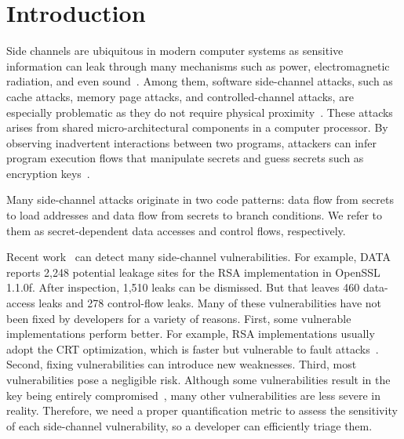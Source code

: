 \section{Introduction} 
Side channels are ubiquitous in modern computer systems as sensitive
information can leak through many mechanisms such as power,
electromagnetic radiation, and even
sound~\cite{agrawal2002side,kar20178,chari1999towards,217605,genkin2014rsa}.
Among them, software side-channel attacks, such as cache attacks, memory page
attacks, and controlled-channel attacks, are especially problematic as they do not require physical proximity~\cite{7163052,217543,217589,lee2017inferring,191010,liu2015last}. These
attacks arises from shared micro-architectural components in a computer processor.
By observing inadvertent interactions between two programs, attackers can infer program
execution flows that manipulate secrets and guess secrets such as encryption
keys~\cite{Osvik2006,Gullasch:2011:CGB:2006077.2006784,203878,10.1007/978-3-540-45238-6_6}.


Many side-channel attacks originate
in two code patterns: data flow from secrets to load
addresses and data flow from secrets to branch conditions. We refer to them as
secret-dependent data accesses and control flows, respectively. 

Recent work~\cite{203878,217537,Wichelmann:2018:MFF:3274694.3274741,Brotzman19Casym,236338,182946}
can detect many side-channel vulnerabilities. For example,
DATA~\cite{217537} reports 2,248 potential leakage sites for the RSA
implementation in OpenSSL 1.1.0f\@. 
After inspection, 1,510 leaks can be dismissed. But that
leaves 460 data-access leaks and 278 control-flow leaks. 
Many of these vulnerabilities have not been fixed by developers for a variety of reasons.
First, some vulnerable implementations perform better. For example,
RSA implementations usually adopt the CRT optimization,
which is faster but vulnerable to fault attacks~\cite{aumuller2002fault}.
Second, fixing vulnerabilities can introduce new 
weaknesses.
Third, most vulnerabilities pose a negligible risk. 
Although some vulnerabilities result in the key being 
entirely compromised~\cite{184415, aumuller2002fault}, 
many other vulnerabilities are less
severe in reality. Therefore, we need a proper quantification metric to 
assess the sensitivity of each side-channel vulnerability,
so a developer can efficiently triage them.

